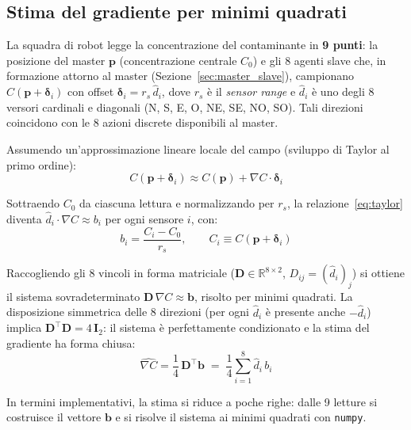 \subsection{Stima del gradiente per minimi quadrati}
\label{sec:stima_gradiente}

La squadra di robot legge la concentrazione del contaminante in \textbf{9 punti}: la posizione
del master $\mathbf{p}$ (concentrazione centrale $C_0$) e gli 8 agenti slave che, in
formazione attorno al master (Sezione~\ref{sec:master_slave}), campionano
$C(\mathbf{p} + \boldsymbol{\delta}_i)$ con offset
$\boldsymbol{\delta}_i = r_s\,\hat{d}_i$, dove $r_s$ \`e il \emph{sensor range} e
$\hat{d}_i$ \`e uno degli 8 versori cardinali e diagonali (N, S, E, O, NE, SE, NO, SO).
Tali direzioni coincidono con le 8 azioni discrete disponibili al master.

Assumendo un'approssimazione lineare locale del campo (sviluppo di Taylor al
primo ordine):
\begin{equation}
    C(\mathbf{p} + \boldsymbol{\delta}_i) \approx C(\mathbf{p}) + \nabla C \cdot \boldsymbol{\delta}_i
    \label{eq:taylor}
\end{equation}

Sottraendo $C_0$ da ciascuna lettura e normalizzando per $r_s$, la
relazione~\eqref{eq:taylor} diventa $\hat{d}_i \cdot \nabla C \approx b_i$ per ogni
sensore $i$, con:
\begin{equation}
    b_i = \frac{C_i - C_0}{r_s}, \qquad C_i \equiv C(\mathbf{p}+\boldsymbol{\delta}_i)
\end{equation}

Raccogliendo gli 8 vincoli in forma matriciale
($\mathbf{D} \in \mathbb{R}^{8 \times 2}$, $D_{ij} = (\hat{d}_i)_j$) si ottiene il
sistema sovradeterminato $\mathbf{D}\,\nabla C \approx \mathbf{b}$, risolto per
minimi quadrati. La disposizione simmetrica delle 8 direzioni (per ogni $\hat{d}_i$
\`e presente anche $-\hat{d}_i$) implica $\mathbf{D}^\top\mathbf{D} = 4\,\mathbf{I}_2$:
il sistema \`e perfettamente condizionato e la stima del gradiente ha forma chiusa:
\begin{equation}
    \hat{\nabla C} = \frac{1}{4}\,\mathbf{D}^\top\mathbf{b}
    \;=\; \frac{1}{4}\sum_{i=1}^{8} \hat{d}_i\,b_i
    \label{eq:grad_ls}
\end{equation}

In termini implementativi, la stima si riduce a poche righe: dalle 9 letture si
costruisce il vettore $\mathbf{b}$ e si risolve il sistema ai minimi quadrati con
\texttt{numpy}.

